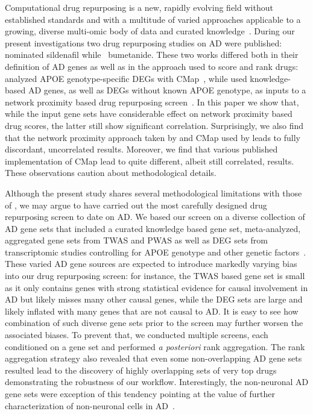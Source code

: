 \documentclass[letterpaper]{article}
\begin{document}
Computational drug repurposing is a new, rapidly evolving field without
established standards and with a multitude of varied approaches applicable to
a growing, diverse multi-omic body of data and curated
knowledge~\citep{Pushpakom2019}.  During our present investigations two drug
repurposing studies on AD were published: \cite{Fang2021} nominated sildenafil
while~\cite{Taubes2021} bumetanide.  These two works differed both in their
definition of AD genes as well as in the approach used to score and rank
drugs: \cite{Taubes2021} analyzed APOE genotype-specific DEGs with
CMap~\citep{Lamb2006}, while \cite{Fang2021} used knowledge-based AD genes, as
well as DEGs without known APOE genotype, as inputs to a network proximity
based drug repurposing screen~\citep{Cheng2018}.  In this paper we show that,
while the input gene sets have considerable effect on network proximity based
drug scores, the latter still show significant correlation.  Surprisingly, we
also find that the network proximity approach taken by \cite{Fang2021} and
CMap used by \cite{Taubes2021} leads to fully discordant, uncorrelated
results.  Moreover, we find that various published implementation of CMap lead
to quite different, albeit still correlated, results.  These observations
caution about methodological details.

Although the present study shares several methodological limitations with
those of \cite{Fang2021,Taubes2021}, we may argue to have carried out the most
carefully designed drug repurposing screen to date on AD.  We based our screen
on a diverse collection of AD gene sets that included a curated knowledge
based gene set, meta-analyzed, aggregated gene sets from TWAS and PWAS as well
as DEG sets from transcriptomic studies controlling for APOE genotype and
other genetic factors~\citep{Lin2018}.  These varied AD gene sources are
expected to introduce markedly varying bias into our drug repurposing screen: for
instance, the TWAS based gene set is small as it only contains genes with
strong statistical evidence for causal involvement in AD but likely misses
many other causal genes, while the DEG sets are large and likely inflated with
many genes that are not causal to AD.  It is easy to see how combination of
such diverse gene sets prior to the screen may further worsen the associated
biases. To prevent that, we conducted multiple screens, each conditioned on a
gene set and performed \emph{a posteriori} rank aggregation.  The rank
aggregation strategy also revealed that even some non-overlapping AD gene sets
resulted lead to the discovery of highly overlapping sets of very top drugs
demonstrating the robustness of our workflow.  Interestingly, the non-neuronal
AD gene sets were exception of this tendency pointing at the value of further
characterization of non-neuronal cells in
AD~\citep{Lopes2022,Mathys2019,DeStrooper2016}.
\end{document}
